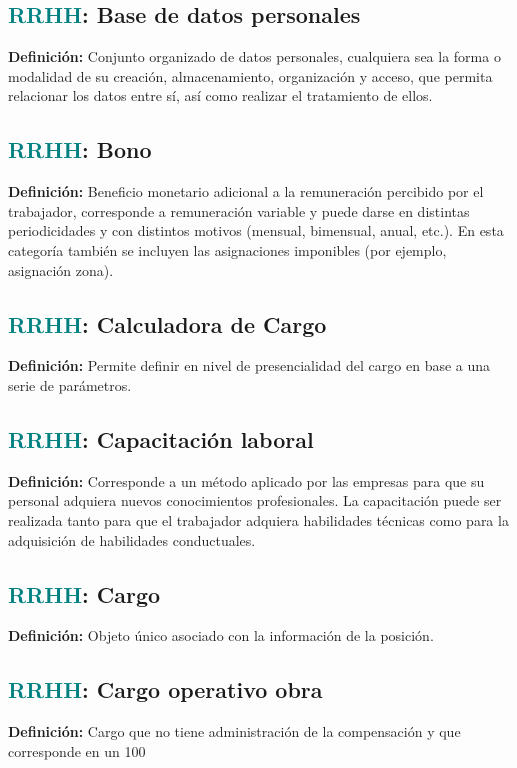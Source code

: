 \documentclass[12pt]{article}
\begin{document}
\subsection{\textcolor{teal}{RRHH}: Base de datos personales}
\textbf{Definición:} Conjunto organizado de datos personales, cualquiera sea la forma o modalidad de su creación, almacenamiento, organización y acceso, que permita relacionar los datos entre sí, así como realizar el tratamiento de ellos.
\subsection{\textcolor{teal}{RRHH}: Bono}
\textbf{Definición:} Beneficio monetario adicional a la remuneración percibido por el trabajador, corresponde a remuneración variable y puede darse en distintas periodicidades y con distintos motivos (mensual, bimensual, anual, etc.). En esta categoría también se incluyen las asignaciones imponibles (por ejemplo, asignación zona).
\subsection{\textcolor{teal}{RRHH}: Calculadora de Cargo}
\textbf{Definición:} Permite definir en nivel de presencialidad del cargo en base a una serie de parámetros. 
\subsection{\textcolor{teal}{RRHH}: Capacitación laboral}
\textbf{Definición:} Corresponde a un método aplicado por las empresas para que su personal adquiera nuevos conocimientos profesionales. La capacitación puede ser realizada tanto para que el trabajador adquiera habilidades técnicas como para la adquisición de habilidades conductuales.
\subsection{\textcolor{teal}{RRHH}: Cargo}
\textbf{Definición:} Objeto único asociado con la información de la posición.
\subsection{\textcolor{teal}{RRHH}: Cargo operativo obra}
\textbf{Definición:} Cargo que no tiene administración de la compensación y que corresponde en un 100%
\end{document}
